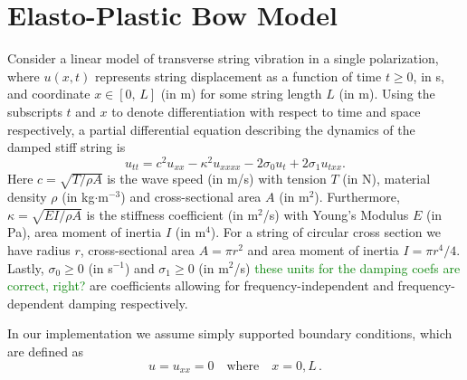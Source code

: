 \documentclass[twoside,a4paper,dvipsnames]{article}
\def\SWcomment[#1]{\textcolor{Green}{#1}}
\begin{document}
\section{Elasto-Plastic Bow Model}\label{sec:elasto}

Consider a linear model of transverse string vibration in a single polarization, where $u(x,t)$ represents string displacement as a function of time $t\geq 0$, in s, and coordinate $x\in[0,\,L]$ (in m) for some string length $L$ (in m). Using the subscripts $t$ and $x$ to denote differentiation with respect to time and space respectively, a partial differential equation describing the dynamics of the damped stiff string is \cite{Bilbao2009}
\begin{equation}\label{eq:PDE}
    u_{tt} = c^2u_{xx}-\kappa^2u_{xxxx}-2\sigma_0u_t+2\sigma_1u_{txx}.
\end{equation}
Here $c = \sqrt{T/\rho A}$ is the wave speed (in m/s) with tension $T$ (in N), material density $\rho$ (in kg$\cdot$m$^{-3}$) and cross-sectional area $A$ (in m$^2$). Furthermore, $\kappa = \sqrt{EI/\rho A}$ is the stiffness coefficient (in m$^2$/s) with Young's Modulus $E$ (in Pa), area moment of inertia $I$ (in m$^4$). For a string of circular cross section we have radius $r$, cross-sectional area $A=\pi r^2$ and area moment of inertia $I=\pi r^4 /4$.  Lastly, $\sigma_0 \geq 0$ (in s$^{-1}$) and $\sigma_1 \geq 0$ (in m$^2$/s) \SWcomment[these units for the damping coefs are correct, right?] are coefficients allowing for frequency-independent and frequency-dependent damping respectively. 

In our implementation we assume simply supported boundary conditions, which are defined as
\begin{equation}
    u = u_{xx} = 0 \quad \text{where} \quad x = 0, L\, .
\end{equation}
\end{document}
